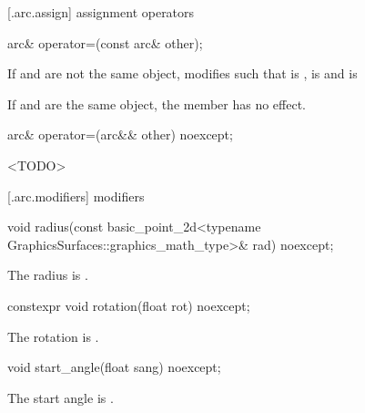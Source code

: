  [\iotwod.arc.assign] { assignment operators}

%
\begin{itemdecl}
arc& operator=(const arc& other);
\end{itemdecl}
\begin{itemdescr}
\pnum
\effects
If  and  are not the same object, modifies  such that  is ,  is  and  is 

\pnum
If  and  are the same object, the member has no effect.

\pnum
\returns
{}
\end{itemdescr}

%
\begin{itemdecl}
arc& operator=(arc&& other) noexcept;
\end{itemdecl}
\begin{itemdescr}
\pnum
\effects
<TODO>

\pnum
\returns
{}
\end{itemdescr}

 [\iotwod.arc.modifiers]{ modifiers}

%
\begin{itemdecl}
void radius(const basic_point_2d<typename GraphicsSurfaces::graphics_math_type>& rad) noexcept;
\end{itemdecl}
\begin{itemdescr}
\pnum
\effects
The radius is .
\end{itemdescr}

%
\begin{itemdecl}
constexpr void rotation(float rot) noexcept;
\end{itemdecl}
\begin{itemdescr}
\pnum
\effects
The rotation is .
\end{itemdescr}

%
\begin{itemdecl}
void start_angle(float sang) noexcept;
\end{itemdecl}
\begin{itemdescr}
\pnum
\effects
The start angle is .
\end{itemdescr}

